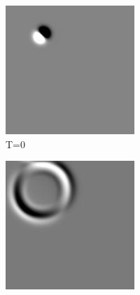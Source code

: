\documentclass[a4paper,11pt]{article}
\begin{document}
\begin{figure}[ht]
\centering
\begin{center}
    
\begin{minipage}[t]{.59\linewidth}
\begin{subfigure}{.33\textwidth}
  \includegraphics[width=.95\linewidth]{images/img000.jpg}
  \caption{T=0}
  \label{fig:sub1}
\end{subfigure}%
\begin{subfigure}{.33\textwidth}
  \centering
  \includegraphics[width=.95\linewidth]{images/img020.jpg}

\end{subfigure}
\end{minipage}
\end{center}
\end{figure}
\end{document}
